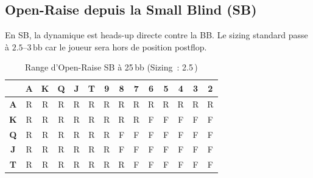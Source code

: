 \documentclass[a4paper,11pt]{article}
\newcommand{\bb}{\,\mathrm{bb}}
\begin{document}
\subsection{Open-Raise depuis la Small Blind (SB)}

En SB, la dynamique est heads-up directe contre la BB. Le sizing standard passe \`a $2.5$--$3\bb$ car le joueur sera hors de position postflop.

\begin{table}[H]
\centering
\caption{Range d'Open-Raise SB \`a 25\,bb (Sizing~: 2.5\bb)}
\label{tab:open_sb}
\small
\begin{tabular}{c|*{13}{c}}
\toprule
 & \textbf{A} & \textbf{K} & \textbf{Q} & \textbf{J} & \textbf{T} & \textbf{9} & \textbf{8} & \textbf{7} & \textbf{6} & \textbf{5} & \textbf{4} & \textbf{3} & \textbf{2} \\
\midrule
\textbf{A} & \cellcolor{raise!30}R & \cellcolor{raise!30}R & \cellcolor{raise!30}R & \cellcolor{raise!30}R & \cellcolor{raise!30}R & \cellcolor{raise!25}R & \cellcolor{raise!20}R & \cellcolor{raise!15}R & \cellcolor{raise!15}R & \cellcolor{raise!15}R & \cellcolor{raise!10}R & \cellcolor{raise!10}R & \cellcolor{raise!10}R \\
\textbf{K} & \cellcolor{raise!30}R & \cellcolor{raise!30}R & \cellcolor{raise!30}R & \cellcolor{raise!30}R & \cellcolor{raise!25}R & \cellcolor{raise!20}R & \cellcolor{raise!15}R & \cellcolor{raise!10}R & \cellcolor{fold!20}F & \cellcolor{fold!20}F & \cellcolor{fold!20}F & \cellcolor{fold!20}F & \cellcolor{fold!20}F \\
\textbf{Q} & \cellcolor{raise!30}R & \cellcolor{raise!25}R & \cellcolor{raise!30}R & \cellcolor{raise!25}R & \cellcolor{raise!20}R & \cellcolor{raise!15}R & \cellcolor{fold!20}F & \cellcolor{fold!20}F & \cellcolor{fold!20}F & \cellcolor{fold!20}F & \cellcolor{fold!20}F & \cellcolor{fold!20}F & \cellcolor{fold!20}F \\
\textbf{J} & \cellcolor{raise!25}R & \cellcolor{raise!25}R & \cellcolor{raise!20}R & \cellcolor{raise!30}R & \cellcolor{raise!20}R & \cellcolor{raise!15}R & \cellcolor{fold!20}F & \cellcolor{fold!20}F & \cellcolor{fold!20}F & \cellcolor{fold!20}F & \cellcolor{fold!20}F & \cellcolor{fold!20}F & \cellcolor{fold!20}F \\
\textbf{T} & \cellcolor{raise!20}R & \cellcolor{raise!20}R & \cellcolor{raise!15}R & \cellcolor{raise!15}R & \cellcolor{raise!30}R & \cellcolor{raise!15}R & \cellcolor{raise!10}R & \cellcolor{fold!20}F & \cellcolor{fold!20}F & \cellcolor{fold!20}F & \cellcolor{fold!20}F & \cellcolor{fold!20}F & \cellcolor{fold!20}F \\

\end{tabular}
\end{table}
\end{document}
